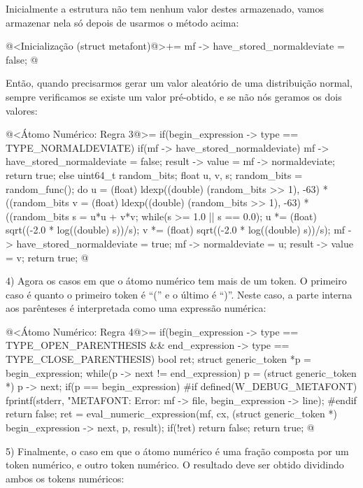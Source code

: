 Inicialmente a estrutura não tem nenhum valor destes armazenado, vamos
armazenar nela só depois de usarmos o método acima:

\iniciocodigo
@<Inicialização (struct metafont)@>+=
mf -> have_stored_normaldeviate = false;
@
\fimcodigo

Então, quando precisarmos gerar um valor aleatório de uma distribuição
normal, sempre verificamos se existe um valor pré-obtido, e se não nós
geramos os dois valores:

\iniciocodigo
@<Átomo Numérico: Regra 3@>=
if(begin_expression -> type == TYPE_NORMALDEVIATE){
  if(mf -> have_stored_normaldeviate){
    mf -> have_stored_normaldeviate = false;
    result -> value = mf -> normaldeviate;
    return true;
  }
  else{
    uint64_t random_bits;
    float u, v, s;
    random_bits = random_func();
    do{
      u = (float) ldexp((double) (random_bits >> 1), -63) *
            ((random_bits %
      v = (float) ldexp((double) (random_bits >> 1), -63) *
            ((random_bits %
      s = u*u + v*v;
    } while(s >= 1.0 || s == 0.0);
    u *= (float) sqrt((-2.0 * log((double) s))/s);
    v *= (float) sqrt((-2.0 * log((double) s))/s);
    mf -> have_stored_normaldeviate = true;
    mf -> normaldeviate = u;
    result -> value = v;
    return true;
  }
}
@
\fimcodigo

4) Agora os casos em que o átomo numérico tem mais de um token. O
primeiro caso é quanto o primeiro token é ``('' e o último é
``)''. Neste caso, a parte interna aos parênteses é interpretada como
uma expressão numérica:

\iniciocodigo
@<Átomo Numérico: Regra 4@>=
if(begin_expression -> type == TYPE_OPEN_PARENTHESIS &&
   end_expression -> type == TYPE_CLOSE_PARENTHESIS){
   bool ret;
   struct generic_token *p = begin_expression;
   while(p -> next != end_expression)
     p = (struct generic_token *) p -> next;
   if(p == begin_expression){
#if defined(W_DEBUG_METAFONT)
    fprintf(stderr, "METAFONT: Error: %
            mf -> file, begin_expression -> line);
#endif
     return false;
   }
   ret = eval_numeric_expression(mf, cx, (struct generic_token *)
                                         begin_expression -> next, p,
                                         result);
   if(!ret)
     return false;
   return true;
}
@
\fimcodigo

5) Finalmente, o caso em que o átomo numérico é uma fração composta
por um token numérico, \monoespaco{/} e outro token numérico. O
resultado deve ser obtido dividindo ambos os tokens numéricos:

